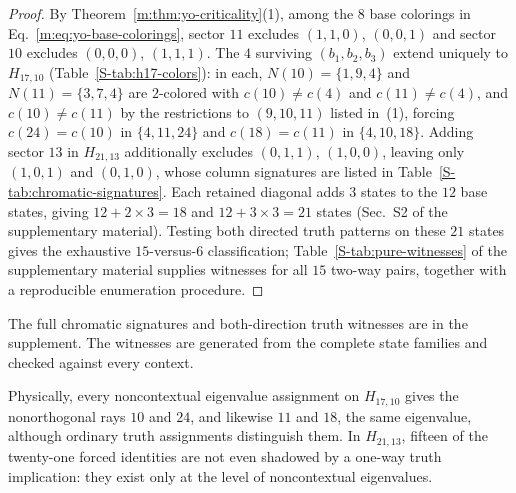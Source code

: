 \documentclass[aps,pra,reprint,superscriptaddress,longbibliography,nofootinbib,floatfix,10pt]{revtex4-2}
\theoremstyle{definition}\newtheorem{definition}[theorem]{Definition}
\theoremstyle{remark}\newtheorem{remark}[theorem]{Remark}
\begin{document}
\begin{proof}
By Theorem~\ref{m:thm:yo-criticality}(1), among the $8$ base colorings in Eq.~\eqref{m:eq:yo-base-colorings}, sector $11$ excludes $(1,1,0)$, $(0,0,1)$ and sector $10$ excludes $(0,0,0)$, $(1,1,1)$. The $4$ surviving $(b_1,b_2,b_3)$ extend uniquely to $H_{17,10}$ (Table~\ref{S-tab:h17-colors}): in each, $N(10)=\{1,9,4\}$ and $N(11)=\{3,7,4\}$ are $2$-colored with $c(10)\ne c(4)$ and $c(11)\ne c(4)$, and $c(10)\ne c(11)$ by the restrictions to $(9,10,11)$ listed in~(1), forcing $c(24)=c(10)$ in $\{4,11,24\}$ and $c(18)=c(11)$ in $\{4,10,18\}$. Adding sector $13$ in $H_{21,13}$ additionally excludes $(0,1,1)$, $(1,0,0)$, leaving only $(1,0,1)$ and $(0,1,0)$, whose column signatures are listed in Table~\ref{S-tab:chromatic-signatures}. Each retained diagonal adds $3$ states to the $12$ base states, giving $12+2\times3=18$ and $12+3\times3=21$ states (Sec.~S2 of the supplementary material). Testing both directed truth patterns on these $21$ states gives the exhaustive $15$-versus-$6$ classification; Table~\ref{S-tab:pure-witnesses} of the supplementary material supplies witnesses for all $15$ two-way pairs, together with a reproducible enumeration procedure.
\end{proof}

The full chromatic signatures and both-direction truth witnesses are in the supplement. The witnesses are generated from the complete state families and checked against every context.

Physically, every noncontextual eigenvalue assignment on $H_{17,10}$ gives the nonorthogonal rays $10$ and $24$, and likewise $11$ and $18$, the same eigenvalue, although ordinary truth assignments distinguish them. In $H_{21,13}$, fifteen of the twenty-one forced identities are not even shadowed by a one-way truth implication: they exist only at the level of noncontextual eigenvalues.
\end{document}
